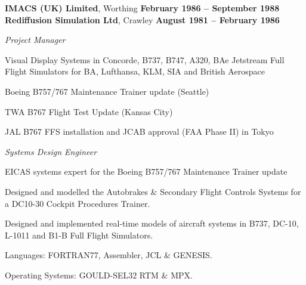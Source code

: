 \documentclass[10pt]{article}
\newenvironment{outerlist}[1][\enskip\textbullet]%
        {\begin{itemize}[#1]}{\end{itemize}%
         \vspace{-.6\baselineskip}}
\newenvironment{innerlist}[1][\enskip\textbullet]%
        {\begin{compactitem}[#1]}{\end{compactitem}}
\newcommand{\blankline}{\quad\pagebreak[2]}
\begin{document}
\textbf{IMACS (UK) Limited}, Worthing        \hfill \textbf{February 1986 -- September 1988}
\textbf{Rediffusion Simulation Ltd}, Crawley        \hfill \textbf{August 1981 -- February 1986}

\begin{outerlist}
\item[] \textit{Project Manager}%
	\begin{innerlist}
	\item Visual Display Systems in Concorde, B737, B747, A320, BAe Jetstream Full Flight Simulators for BA, Lufthansa, KLM, SIA and British Aerospace
	\item Boeing B757/767 Maintenance Trainer update (Seattle)
	\item TWA B767 Flight Test Update (Kansas City)
	\item JAL B767 FFS installation and JCAB approval (FAA Phase II) in Tokyo
	\end{innerlist}

\item[] \textit{Systems Design Engineer} %
	\begin{innerlist}
	\item EICAS systems expert for the Boeing B757/767 Maintenance Trainer update
	\item Designed and modelled the Autobrakes \& Secondary Flight Controls Systems for a DC10-30 Cockpit Procedures Trainer.
	\item Designed and implemented real-time models of aircraft systems in B737, DC-10, L-1011 and B1-B Full Flight Simulators.
	\item Languages: FORTRAN77, Assembler, JCL \& GENESIS.
	\item Operating Systems: GOULD-SEL32 RTM \& MPX.
	\end{innerlist}
\end{outerlist}

\blankline

%
%
%
\end{document}
